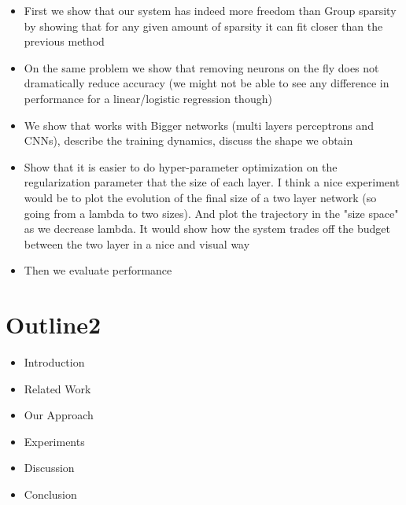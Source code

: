 \documentclass{article}
\begin{document}
\begin{itemize}
  \item First we show that our system has indeed more freedom than Group sparsity by showing that for any given amount of sparsity it can fit closer than the previous method
  \item On the same problem we show that removing neurons on the fly does not dramatically reduce accuracy (we might not be able to see any difference in performance for a linear/logistic regression though)
  \item We show that works with Bigger networks (multi layers perceptrons and CNNs), describe the training dynamics, discuss the shape we obtain
  \item Show that it is easier to do hyper-parameter optimization on the regularization parameter that the size of each layer. I think a nice experiment would be to plot the evolution of the final size of a two layer network (so going from a lambda to two sizes). And plot the trajectory in the "size space" as we decrease lambda. It would show how the system trades off the budget between the two layer in a nice and visual way
  \item Then we evaluate performance
\end{itemize}

\section{Outline2}
\begin{itemize}
  \item Introduction
  \item Related Work
  \item Our Approach
  \item Experiments
  \item Discussion
  \item Conclusion
\end{itemize}









\appendix



\nocite{OpenML2013}



\end{document}
